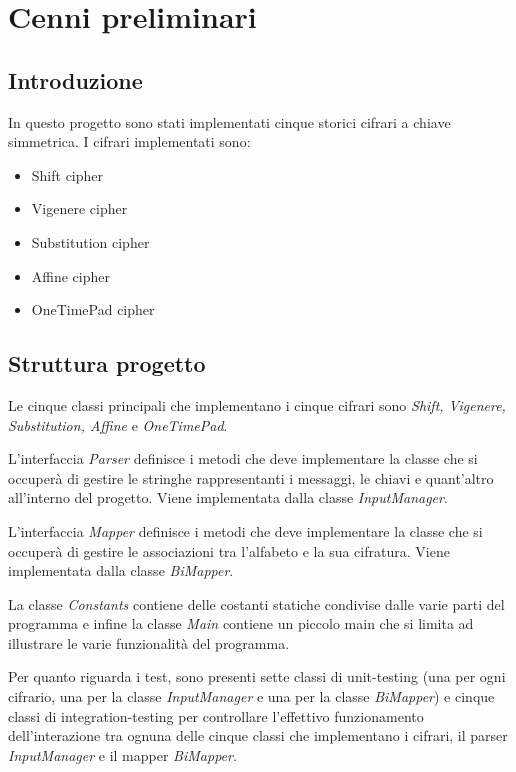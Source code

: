 \chapter{Cenni preliminari}

	\section{Introduzione}
		In questo progetto sono stati implementati cinque storici cifrari a chiave simmetrica. I cifrari implementati sono:
		\begin{itemize}
			\item Shift cipher
			\item Vigenere cipher
			\item Substitution cipher
			\item Affine cipher
			\item OneTimePad cipher
		\end{itemize}
		
	\section{Struttura progetto}
		Le cinque classi principali che implementano i cinque cifrari sono \emph{Shift, Vigenere, Substitution, Affine} e \emph{OneTimePad}.
		
		L'interfaccia \emph{Parser} definisce i metodi che deve implementare la classe che si occuperà di gestire le stringhe rappresentanti i messaggi, le chiavi e quant'altro all'interno del progetto. Viene implementata dalla classe \emph{InputManager}.
		
		L'interfaccia \emph{Mapper} definisce i metodi che deve implementare la classe che si occuperà di gestire le associazioni tra l'alfabeto e la sua cifratura. Viene implementata dalla classe \emph{BiMapper}.
		
		La classe \emph{Constants} contiene delle costanti statiche condivise dalle varie parti del programma e infine la classe \emph{Main} contiene un piccolo main che si limita ad illustrare le varie funzionalità del programma.
		
		Per quanto riguarda i test, sono presenti sette classi di unit-testing (una per ogni cifrario, una per la classe \emph{InputManager} e una per la classe \emph{BiMapper}) e cinque classi di integration-testing per controllare l'effettivo funzionamento dell'interazione tra ognuna delle cinque classi che implementano i cifrari, il parser \emph{InputManager} e il mapper \emph{BiMapper}.